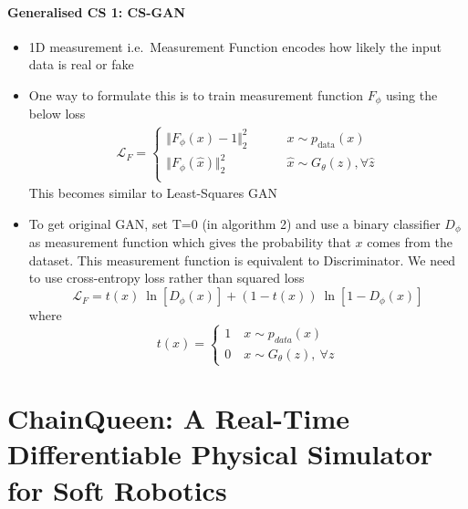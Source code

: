 \documentclass{article}
\begin{document}
    \paragraph{Generalised CS 1: CS-GAN}
    \begin{itemize}
        \item 1D measurement i.e.\ Measurement Function encodes how likely the input data is real or fake
        \item One way to formulate this is to train measurement function $F_\phi$ using the below loss
        \begin{align*}
            \mathcal{L}_F =
            \begin{cases}
                \Vert {F_\phi(x) - 1} \Vert_2^2 \quad \quad &x \sim p_{\textrm{data}}(x) \\
                \Vert {F_\phi(\hat{x})} \Vert_2^2 \quad \quad \quad \quad &\hat{x} \sim G_\theta(\hat{z}), \forall \hat{z} \\
            \end{cases}
        \end{align*}
        This becomes similar to Least-Squares GAN
        \item To get original GAN, set T=0 (in algorithm 2) and use a binary classifier $D_\phi$ as measurement function which gives the probability that $x$ comes from the dataset.
        This measurement function is equivalent to Discriminator.
        We need to use cross-entropy loss rather than squared loss
        \[\mathcal{L}_F = t(x)\ \ln[D_\phi(x)] + (1-t(x))\ \ln[1-D_\phi(x)]\]
        where
        \[t(x) =
        \begin{cases}
            1 \quad x \sim p_{data}(x) \\
            0 \quad x \sim G_\theta(z),\ \forall z
        \end{cases}
        \]
    \end{itemize}
    \newpage


    \section{ChainQueen: A Real-Time Differentiable Physical Simulator for Soft Robotics}\label{sec:ChainQueen_A_Real_Time_Differentiable_Physical_Simulator_for_Soft_Robotics}
\end{document}
